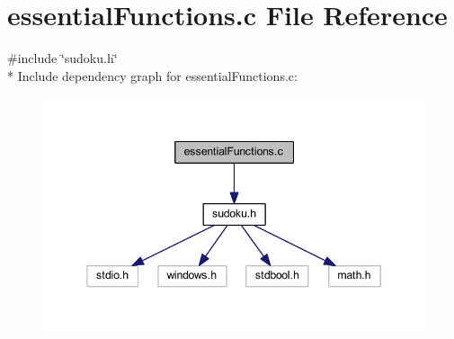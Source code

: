 \section{essential\+Functions.\+c File Reference}
\label{essential_functions_8c}
{\ttfamily \#include \char`\"{}sudoku.\+h\char`\"{}}\\*
Include dependency graph for essential\+Functions.\+c\+:
\nopagebreak
\begin{figure}[H]
\begin{center}
\leavevmode
\includegraphics[width=345pt]{essential_functions_8c__incl}
\end{center}
\end{figure}
